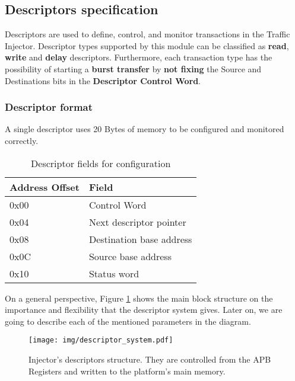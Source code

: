 \subsection{Descriptors specification}
\label{section:descriptors}
Descriptors are used to define, control, and monitor transactions in the Traffic Injector. Descriptor types supported by this module can be classified as \textbf{read}, \textbf{write} and \textbf{delay} descriptors. Furthermore, each transaction type has the possibility of starting a \textbf{burst transfer} by \textbf{not fixing} the Source and Destinations bits in the \textbf{Descriptor Control Word}.

\subsubsection{Descriptor format}

A single descriptor uses 20 Bytes of memory to be configured and monitored correctly.

\begin{table}[ht]
	\scriptsize
	\centering
	\begin{tabular}{ll}
		\hline
		Address Offset & Field
		\\
		\hline
		0x00 & Control Word
		\\
		0x04 & Next descriptor pointer
		\\
		0x08 & Destination base address
		\\
		0x0C & Source base address 
		\\
		0x10 & Status word
		\\
		\hline
	\end{tabular}
	\caption{Descriptor fields for configuration}
	\label{registers:descriptors}
\end{table}

On a general perspective, Figure \ref{figure:descriptor_system} shows the main block structure on the importance and flexibility that the descriptor system gives. Later on, we are going to describe each of the mentioned parameters in the diagram.\\\vspace{1cm}

\begin{figure}[H]
  \centering
  \texttt{[image: img/descriptor\_system.pdf]}
  \caption{Injector's descriptors structure. They are controlled from the APB Registers and written to the platform's main memory.}
  \label{figure:descriptor_system}
\end{figure}

